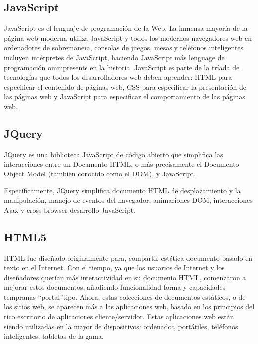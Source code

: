 \subsection{JavaScript} 

JavaScript es el lenguaje de programaci\'{o}n de la Web. La inmensa mayor\'{i}a
de la p\'{a}gina web moderna utiliza JavaScript y todos los modernos navegadores
web en ordenadores de sobremanera, consolas de juegos, mesas y tel\'{e}fonos 
inteligentes incluyen int\'{e}rpretes de JavaScript, haciendo JavaScript m\'{a}s
lenguage de programaci\'{o}n  omnipresente en la historia. JavaScript es parte de
la tr\'{i}ada de tecnolog\'{i}as que todos los desarrolladores web deben aprender:
HTML para especificar el contenido de p\'{a}ginas web, CSS para especificar la 
presentaci\'{o}n de las p\'{a}ginas web y JavaScript para especificar el comportamiento
de las p\'{a}ginas web. \cite{flanagan2006javascript}

\subsection{JQuery}

JQuery es una biblioteca JavaScript de c\'{o}digo abierto que simplifica las 
interacciones entre un Documento HTML, o m\'{a}s precisamente el Documento 
Object Model (tambi\'{e}n conocido como el DOM), y JavaScript.

Espec\'{i}ficamente, JQuery simplifica documento HTML de desplazamiento y la 
manipulaci\'{o}n, manejo de eventos del navegador, animaciones DOM, interacciones
Ajax y cross-browser desarrollo JavaScript.\cite{lindley2009jquery}

\subsection{HTML5}

HTML fue dise\~{n}ado originalmente para, compartir est\'{a}tica documento basado
en texto en el Internet. Con el tiempo, ya que los usuarios de Internet y los 
dise\~{n}adores quer\'{i}an m\'{a}s interactividad en su documento HTML, comenzaron
a mejorar estos documentos, a\~{n}adiendo funcionalidad forma y capacidades tempranas
\textquotedblleft portal\textquotedblright tipo. Ahora, estas colecciones de 
documentos est\'{a}ticos, o de los sitios web, se aparecen m\'{a}s a las aplicaciones
web, basado en los principios del rico escritorio de aplicaciones cliente/servidor.
Estas aplicaciones web est\'{a}n siendo utilizadas en la mayor de dispositivos: 
ordenador, port\'{a}tiles, tel\'{e}fonos inteligentes, tabletas de la gama.

